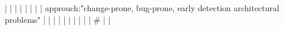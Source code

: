 |    |            |      |                                                                      |                                                                                                                                                                          |                                                                                                                                                                                                                                                            |                                                                                                                                                                                                                                                                      |  approuch:"change-prone, bug-prone, early detection architectural problems"                                                                                                                                                                                                                              |                                                                                                                                                                                                                                                                                                                                                                                                                                                                                              |
|    |            |      |                                                                      |                                                                                                                                                                          |                                                                                                                                                                                                                                                            |                                                                                                                                                                                                                                                                      |  #                                                                                                                                                                                                                                                                                                       |                                                                                                                                                                                                                                                                                                                                                                                                                                                                                              |
